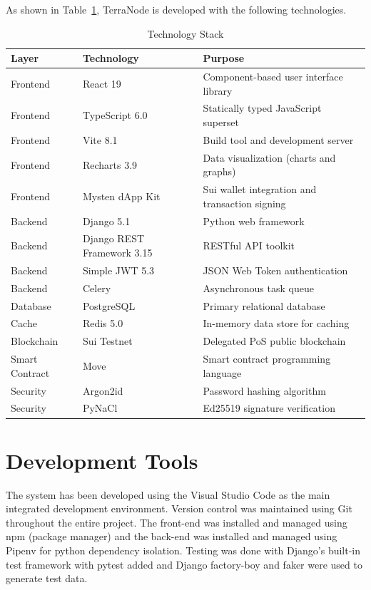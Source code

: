 As shown in Table~\ref{tab:tech_stack}, TerraNode is developed with the following technologies.

\begin{table}[H]
\centering
\small
\singlespacing
\renewcommand{\arraystretch}{1.15}
\caption{Technology Stack}
\label{tab:tech_stack}
\begin{tabularx}{\textwidth}{|l|l|>{\raggedright\arraybackslash}X|}
\hline
\textbf{Layer} & \textbf{Technology} & \textbf{Purpose} \\
\hline
Frontend & React 19 & Component-based user interface library \\
\hline
Frontend & TypeScript 6.0 & Statically typed JavaScript superset \\
\hline
Frontend & Vite 8.1 & Build tool and development server \\
\hline
Frontend & Recharts 3.9 & Data visualization (charts and graphs) \\
\hline
Frontend & Mysten dApp Kit & Sui wallet integration and transaction signing \\
\hline
Backend & Django 5.1 & Python web framework \\
\hline
Backend & Django REST Framework 3.15 & RESTful API toolkit \\
\hline
Backend & Simple JWT 5.3 & JSON Web Token authentication \\
\hline
Backend & Celery & Asynchronous task queue \\
\hline
Database & PostgreSQL & Primary relational database \\
\hline
Cache & Redis 5.0 & In-memory data store for caching \\
\hline
Blockchain & Sui Testnet & Delegated PoS public blockchain \\
\hline
Smart Contract & Move & Smart contract programming language \\
\hline
Security & Argon2id & Password hashing algorithm \\
\hline
Security & PyNaCl & Ed25519 signature verification \\
\hline
\end{tabularx}
\end{table}
\section{Development Tools}

The system has been developed using the Visual Studio Code as the main integrated development environment. Version control was maintained using Git throughout the entire project. The front-end was installed and managed using npm (package manager) and the back-end was installed and managed using Pipenv for python dependency isolation. Testing was done with Django's built-in test framework with pytest added and Django factory-boy and faker were used to generate test data.

